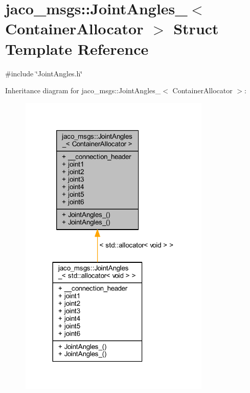 \hypertarget{structjaco__msgs_1_1JointAngles__}{}\section{jaco\+\_\+msgs\+:\+:Joint\+Angles\+\_\+$<$ Container\+Allocator $>$ Struct Template Reference}
\label{structjaco__msgs_1_1JointAngles__}


{\ttfamily \#include \char`\"{}Joint\+Angles.\+h\char`\"{}}



Inheritance diagram for jaco\+\_\+msgs\+:\+:Joint\+Angles\+\_\+$<$ Container\+Allocator $>$\+:
\nopagebreak
\begin{figure}[H]
\begin{center}
\leavevmode
\includegraphics[width=258pt]{de/d8e/structjaco__msgs_1_1JointAngles____inherit__graph}
\end{center}
\end{figure}


